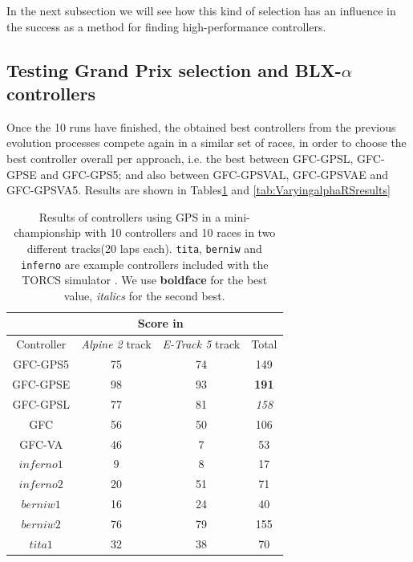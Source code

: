 \documentclass[10pt,journal,compsoc]{IEEEtran}
\begin{document}
 In the next subsection we
will see how this kind of selection has an influence in the success as
a method for finding high-performance controllers.



\subsection{Testing Grand Prix selection and BLX-$\alpha$ controllers}


Once the 10 runs have finished, the obtained best controllers from the
previous evolution processes compete again in a similar set of races,
in order to choose the best controller overall per approach, i.e. the
best between {\sf GFC-GPSL}, {\sf GFC-GPSE} and {\sf GFC-GPS5}; and also between
{\sf GFC-GPSVAL}, {\sf GFC-GPSVAE} and {\sf GFC-GPSVA5}. 
Results are shown in Tables\ref{tab:RSresults} and \ref{tab:VaryingalphaRSresults}

\begin{table}[ht]
	\centering
	{\scriptsize
		\caption{ Results of controllers using GPS in a mini-championship with 10 controllers and 10
			races in two different tracks(20 laps each). {\tt tita}, {\tt berniw} and {\tt
				inferno} are example controllers included with the TORCS
			simulator \cite{torcs4}. We use {\bf boldface}
                      for the best value, {\em italics} for the second
                    best. }
		{
                  \begin{tabular}{|c|c|c||c|}
                    \hline
                    & \multicolumn{2}{|c|}{Score in} & \\
                    \hline
                    Controller&\textit{Alpine 2} track &\textit{E-Track 5} track &Total\\
				\hline
				\hline
				
			{\sf GFC-GPS5}\cite{DBLP:conf/cig/SalemMG19}&	75	&74&	149\\
			{\sf GFC-GPSE}&	98	&93&	{\bf 191}\\
			{\sf GFC-GPSL}\cite{DBLP:conf/cig/SalemMG19}&	77	&81&	{\em 158}\\
			{\sf GFC} \cite{salem_cig2018}	&	56	&50&	106\\
			{\sf GFC-VA}\cite{DBLP:conf/cig/SalemMG19}	&	46	&7&		53\\
			$inferno1$&	9	&8&		17\\
			$inferno2$&		20	&51&	71\\
			$berniw1$&	16	&24&	40\\
			$berniw2$&	76	&79&	155\\
			$tita1$&32	&38&	70\\		
				\hline
				
			\end{tabular}
		}\label{tab:RSresults}
	}
\end{table}
%
\end{document}

